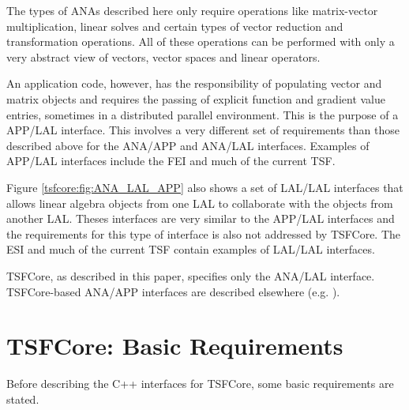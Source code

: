 The types of ANAs described here only require operations like
matrix-vector multiplication, linear solves and certain types of
vector reduction and transformation operations.  All of these
operations can be performed with only a very abstract view of vectors,
vector spaces and linear operators.

An application code, however, has the responsibility of populating
vector and matrix objects and requires the passing of explicit
function and gradient value entries, sometimes in a distributed
parallel environment.  This is the purpose of a APP/LAL interface.
This involves a very different set of requirements than those
described above for the ANA/APP and ANA/LAL interfaces.  Examples of
APP/LAL interfaces include the FEI \cite{ref:fei} and much of the
current TSF.

Figure \ref{tsfcore:fig:ANA_LAL_APP} also shows a set of LAL/LAL
interfaces that allows linear algebra objects from one LAL to
collaborate with the objects from another LAL.  Theses interfaces are
very similar to the APP/LAL interfaces and the requirements for this
type of interface is also not addressed by TSFCore.  The ESI
\cite{ref:esi_2001} and much of the current TSF contain examples of
LAL/LAL interfaces.

TSFCore, as described in this paper, specifies only the
ANA/LAL interface.  TSFCore-based ANA/APP interfaces are
described elsewhere (e.g. \cite{ref:TSFCore::Nonlin}).

%
\section{TSFCore: Basic Requirements}
\label{tsfcore:sec:TSFCore_requirements}
%

Before describing the C++ interfaces for TSFCore, some basic
requirements are stated.

